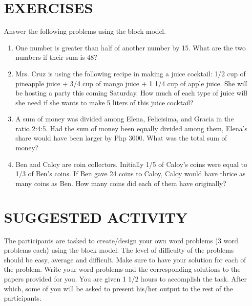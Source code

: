 \section*{EXERCISES}
Answer the following problems using the block model.
\begin{enumerate}
\item One number is greater than half of another number by 15. What are the two numbers if
their sum is 48?
\item Mrs. Cruz is using the following recipe in making a juice cocktail: 1/2 cup of pineapple juice $+$ 3/4
cup of mango juice $+$ 1 1/4 cup of apple juice. She will be hosting a party this coming
Saturday. How much of each type of juice will she need if she wants to make 5 liters of this
juice cocktail?
\item A sum of money was divided among Elena, Felicisima, and Gracia in the ratio 2:4:5. Had the
sum of money been equally divided among them, Elena's share would have been larger by
Php 3000. What was the total sum of money?
\item Ben and Caloy are coin collectors. Initially 1/5 of Caloy's coins were equal to 1/3 of Ben's
coins. If Ben gave 24 coins to Caloy, Caloy would have thrice as many coins as Ben. How
many coins did each of them have originally?
\end{enumerate}

\section*{SUGGESTED ACTIVITY}
The participants are tasked to create/design your own word problems (3 word problems
each) using the block model. The level of difficulty of the problems should be easy, average and
difficult. Make sure to have your solution for each of the problem. Write your word problems and
the corresponding solutions to the papers provided for you. You are given 1 1/2 hours to accomplish
the task. After which, some of you will be asked to present his/her output to the rest of the
participants.
